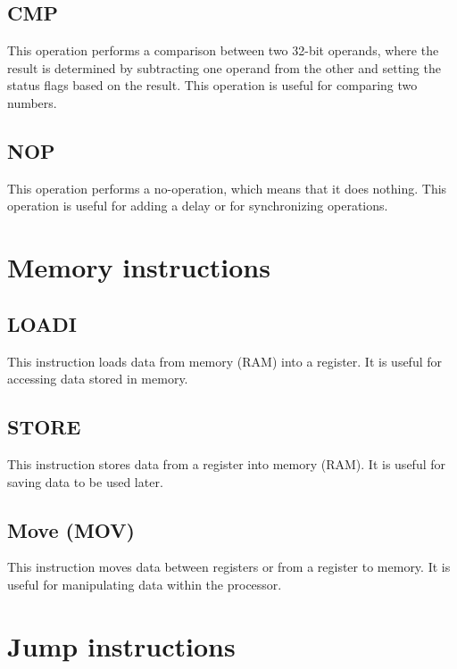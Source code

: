\documentclass[9pt,a4paper,twoside]{tau}
\begin{document}
        \subsection{CMP}
        This operation performs a comparison between two 32-bit operands, where the result is determined by subtracting one operand from the other and setting the status flags based on the result. This operation is useful for comparing two numbers. 
        \subsection{NOP}
        This operation performs a no-operation, which means that it does nothing. This operation is useful for adding a delay or for synchronizing operations.
    
       

        \section{Memory instructions}

    
        \subsection{LOADI}
        This instruction loads data from memory (RAM) into a register. It is useful for accessing data stored in memory. 
        \subsection{STORE}
        This instruction stores data from a register into memory (RAM). It is useful for saving data to be used later.
        \subsection{Move (MOV)}
        This instruction moves data between registers or from a register to memory. It is useful for manipulating data within the processor.
    
        \section{Jump instructions}
    
\end{document}

